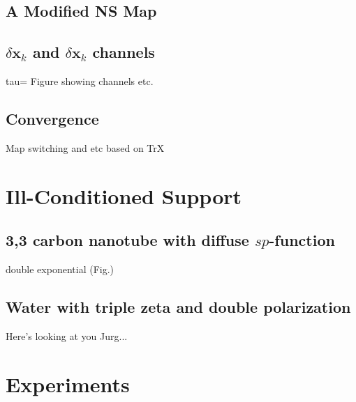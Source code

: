 \documentclass[letterpaper,twocolumn,amsmath,amsfont,amssymb,english,aps,jcp,preprintnumbers,groupaddress,nofootinbib,tightenlines]{revtex4}
\newcommand{\mat}[1]{\boldsymbol{#1}}
\begin{document}
\subsection{A Modified NS Map}

\subsection{$\delta \mat{x}_k$ and $\delta \mat{x}_k$ channels}
tau= Figure showing channels etc.  

\subsection{Convergence}
Map switching and etc based on TrX


\section{Ill-Conditioned Support}

\subsection{ 3,3 carbon nanotube with diffuse $sp$-function}
double exponential (Fig.)

\subsection{Water with triple zeta and double polarization}
Here's looking at you Jurg...

\section{Experiments}
\end{document}
